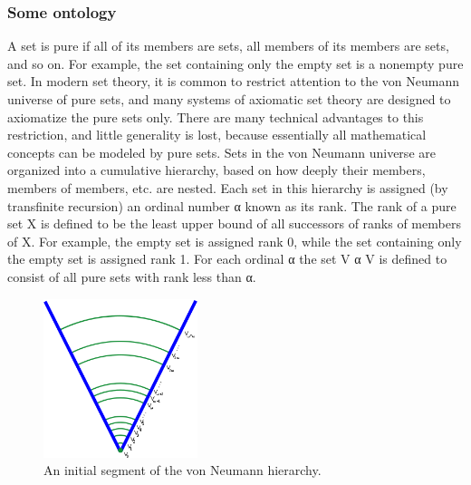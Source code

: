 \documentclass{article}
\begin{document}
\subsubsection{Some ontology}
A set is pure if all of its members are sets, all members of its members are sets, and so on. For example, the set {{}} containing only the empty set is a nonempty pure set. In modern set theory, it is common to restrict attention to the von Neumann universe of pure sets, and many systems of axiomatic set theory are designed to axiomatize the pure sets only. There are many technical advantages to this restriction, and little generality is lost, because essentially all mathematical concepts can be modeled by pure sets. Sets in the von Neumann universe are organized into a cumulative hierarchy, based on how deeply their members, members of members, etc. are nested. Each set in this hierarchy is assigned (by transfinite recursion) an ordinal number α known as its rank. The rank of a pure set X is defined to be the least upper bound of all successors of ranks of members of X. For example, the empty set is assigned rank 0, while the set {{}} containing only the empty set is assigned rank 1. For each ordinal α the set V α V is defined to consist of all pure sets with rank less than α.
\begin{figure}[h]
\includegraphics[width=0.4\textwidth]{si.png}
\caption{An initial segment of the von Neumann hierarchy.}
\end{figure}
\end{document}
